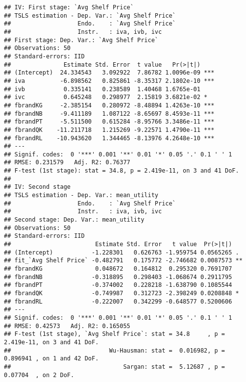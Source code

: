 \documentclass[
]{article}
\begin{document}
\begin{verbatim}
## IV: First stage: `Avg Shelf Price`
## TSLS estimation - Dep. Var.: `Avg Shelf Price`
##                   Endo.    : `Avg Shelf Price`
##                   Instr.   : iva, ivb, ivc
## First stage: Dep. Var.: `Avg Shelf Price`
## Observations: 50
## Standard-errors: IID 
##               Estimate Std. Error  t value   Pr(>|t|)    
## (Intercept)  24.334543   3.092922  7.86782 1.0096e-09 ***
## iva          -6.898562   0.825861 -8.35317 2.1802e-10 ***
## ivb           0.335141   0.238589  1.40468 1.6765e-01    
## ivc           0.645248   0.298977  2.15819 3.6821e-02 *  
## fbrandKG     -2.385154   0.280972 -8.48894 1.4263e-10 ***
## fbrandNB     -9.411189   1.087122 -8.65697 8.4593e-11 ***
## fbrandPT     -5.511500   0.615284 -8.95766 3.3486e-11 ***
## fbrandQK    -11.211718   1.215269 -9.22571 1.4790e-11 ***
## fbrandRL    -10.943620   1.344465 -8.13976 4.2648e-10 ***
## ---
## Signif. codes:  0 '***' 0.001 '**' 0.01 '*' 0.05 '.' 0.1 ' ' 1
## RMSE: 0.231579   Adj. R2: 0.76377
## F-test (1st stage): stat = 34.8, p = 2.419e-11, on 3 and 41 DoF.
## 
## IV: Second stage
## TSLS estimation - Dep. Var.: mean_utility
##                   Endo.    : `Avg Shelf Price`
##                   Instr.   : iva, ivb, ivc
## Second stage: Dep. Var.: mean_utility
## Observations: 50
## Standard-errors: IID 
##                        Estimate Std. Error   t value  Pr(>|t|)    
## (Intercept)           -1.228301   0.626763 -1.959754 0.0565265 .  
## fit_`Avg Shelf Price` -0.482791   0.175772 -2.746682 0.0087573 ** 
## fbrandKG               0.048672   0.164812  0.295320 0.7691707    
## fbrandNB              -0.318895   0.298403 -1.068674 0.2911795    
## fbrandPT              -0.374002   0.228218 -1.638790 0.1085544    
## fbrandQK              -0.749987   0.312723 -2.398249 0.0208848 *  
## fbrandRL              -0.222007   0.342299 -0.648577 0.5200606    
## ---
## Signif. codes:  0 '***' 0.001 '**' 0.01 '*' 0.05 '.' 0.1 ' ' 1
## RMSE: 0.42573   Adj. R2: 0.165055
## F-test (1st stage), `Avg Shelf Price`: stat = 34.8     , p = 2.419e-11, on 3 and 41 DoF.
##                            Wu-Hausman: stat =  0.016982, p = 0.896941 , on 1 and 42 DoF.
##                                Sargan: stat =  5.12687 , p = 0.07704  , on 2 DoF.
\end{verbatim}
\end{document}

